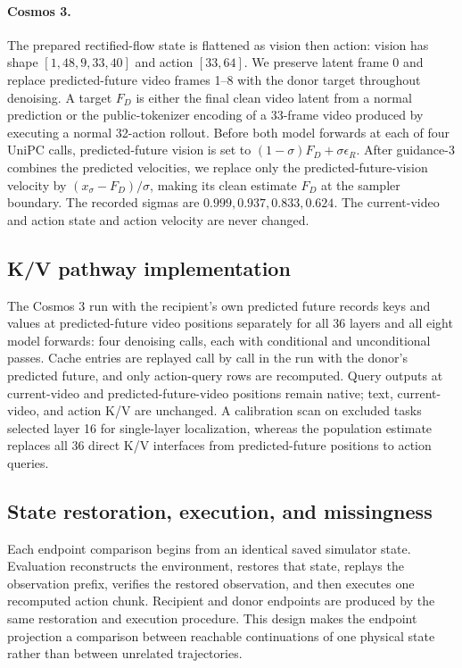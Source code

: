 \documentclass{article}
\begin{document}
\paragraph{Cosmos 3.}
The prepared rectified-flow state is flattened as vision then action: vision has shape $[1,48,9,33,40]$ and action $[33,64]$. We preserve latent frame 0 and replace predicted-future video frames 1--8 with the donor target throughout denoising. A target $F_D$ is either the final clean video latent from a normal prediction or the public-tokenizer encoding of a 33-frame video produced by executing a normal 32-action rollout. Before both model forwards at each of four UniPC calls, predicted-future vision is set to $(1-\sigma)F_D+\sigma\epsilon_R$. After guidance-3 combines the predicted velocities, we replace only the predicted-future-vision velocity by $(x_\sigma-F_D)/\sigma$, making its clean estimate $F_D$ at the sampler boundary. The recorded sigmas are $0.999,0.937,0.833,0.624$. The current-video and action state and action velocity are never changed.

\subsection{K/V pathway implementation}
\label{app:pathway_impl}

The Cosmos 3 run with the recipient's own predicted future records keys and values at predicted-future video positions separately for all 36 layers and all eight model forwards: four denoising calls, each with conditional and unconditional passes. Cache entries are replayed call by call in the run with the donor's predicted future, and only action-query rows are recomputed. Query outputs at current-video and predicted-future-video positions remain native; text, current-video, and action K/V are unchanged. A calibration scan on excluded tasks selected layer 16 for single-layer localization, whereas the population estimate replaces all 36 direct K/V interfaces from predicted-future positions to action queries.

\subsection{State restoration, execution, and missingness}

Each endpoint comparison begins from an identical saved simulator state. Evaluation reconstructs the environment, restores that state, replays the observation prefix, verifies the restored observation, and then executes one recomputed action chunk. Recipient and donor endpoints are produced by the same restoration and execution procedure. This design makes the endpoint projection a comparison between reachable continuations of one physical state rather than between unrelated trajectories.
\end{document}
